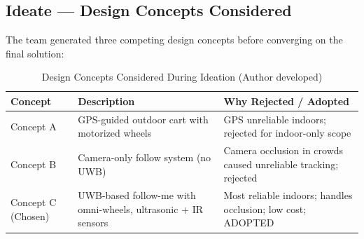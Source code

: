 \subsection{Ideate --- Design Concepts Considered}

The team generated three competing design concepts before converging on
the final solution:

\begin{table}[!ht]
\caption{Design Concepts Considered During Ideation (Author developed)}
\label{tab:ideate}
\centering
\footnotesize
\begin{tabular}{p{1.2cm} p{2.3cm} p{3.0cm}}
\toprule
\textbf{Concept} & \textbf{Description} & \textbf{Why Rejected / Adopted} \\
\midrule
Concept A & GPS-guided outdoor cart with motorized wheels & GPS unreliable indoors; rejected for indoor-only scope \\
Concept B & Camera-only follow system (no UWB) & Camera occlusion in crowds caused unreliable tracking; rejected \\
Concept C (Chosen) & UWB-based follow-me with omni-wheels, ultrasonic + IR sensors & Most reliable indoors; handles occlusion; low cost; ADOPTED \\
\bottomrule
\end{tabular}
\end{table}